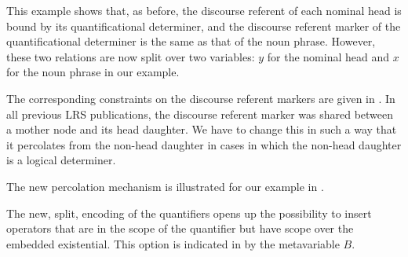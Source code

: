 \documentclass[output=paper]{langsci/langscibook}
\begin{document}
This example shows that, as before, the discourse referent of each nominal head is bound by its quantificational determiner, and the discourse referent mark\-er of the quantificational determiner is the same as that of the noun phrase.  However, these two relations are now split over two variables: $y$ for the nominal head and $x$ for the noun phrase  in our example.



The corresponding constraints on the discourse referent markers are given in . 
In all previous LRS publications, the discourse referent marker was shared between a mother node and its head daughter. We have to change this in such a way that it percolates from the non-head daughter in cases in which the non-head daughter is a logical determiner.


\ea \label{dr-princ}
\begin{xlist}
\end{xlist}
\z 

The new percolation mechanism is illustrated for our example in .


\ea \label{ex-dr-princ}
\begin{xlist}
\end{xlist}
\z 


The new, split, encoding of the quantifiers opens up the possibility to insert operators that are in the scope of the quantifier but have scope over the embedded existential. This option is indicated in  by the metavariable $B$.

\end{document}
